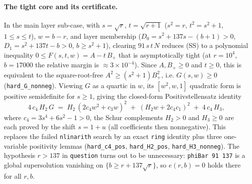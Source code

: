 \documentclass{article}
\begin{document}
\paragraph{The tight core and its certificate.}
In the main layer sub-case, with $s=\sqrt r$, $t=\sqrt{r+1}$ ($s^2=r$, $t^2=s^2+1$,
$1\le s\le t$), $w=b-r$, and layer membership ($D_0=s^2+137s-(b+1)>0$,
$D_1=s^2+137t-b>0$, $b\ge s^2+1$), clearing $91\,s\,t\,N$ reduces (SS) to a
polynomial inequality $0\le F(s,t,w)=A-t\,B_{+}$ that is asymptotically tight (at
$r=10^4$, $b=17000$ the relative margin is $\approx3\times10^{-4}$). Since
$A,B_{+}\ge0$ and $t\ge0$, this is equivalent to the square-root-free
$A^2\ge(s^2+1)B_{+}^2$, i.e. $G(s,w)\ge0$ (\texttt{hard\_G\_nonneg}). Viewing $G$ as a
quartic in $w$, its $[w^2,w,1]$ quadratic form is positive semidefinite for $s\ge1$,
giving the closed-form Positivstellensatz identity
\[
  4\,c_4\,H_2\,G \;=\; H_2\,(2c_4w^2+c_3w)^2 \;+\; (H_2w+2c_4c_1)^2 \;+\; 4\,c_4\,H_3,
\]
where $c_4=3s^4+6s^2-1>0$, the Schur complements $H_2>0$ and $H_3\ge0$ are each
proved by the shift $s=1+u$ (all coefficients then nonnegative). This replaces the
failed \texttt{nlinarith} search by an exact \texttt{ring} identity plus three
one-variable positivity lemmas (\texttt{hard\_c4\_pos}, \texttt{hard\_H2\_pos},
\texttt{hard\_H3\_nonneg}). The hypothesis $r>137$ in \texttt{question} turns out to
be unnecessary: \texttt{phiBar 91 137} is a global supersolution vanishing on
$\{b\ge r+137\sqrt r\}$, so $e(r,b)=0$ holds there for all $r,b$.
\end{document}
